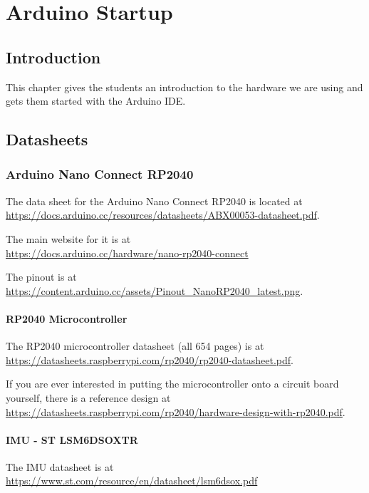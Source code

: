\chapter{Arduino Startup}

\section{Introduction}
This chapter gives the students an introduction to the hardware we are using and gets them started with 
the Arduino IDE.

\section{Datasheets}
\subsection{Arduino Nano Connect RP2040}
The data sheet for the Arduino Nano Connect RP2040 is located at\\ 
\href{https://docs.arduino.cc/resources/datasheets/ABX00053-datasheet.pdf}{https://docs.arduino.cc/resources/datasheets/ABX00053-datasheet.pdf}.

The main website for it is at \\
\href{https://docs.arduino.cc/hardware/nano-rp2040-connect}{https://docs.arduino.cc/hardware/nano-rp2040-connect}

The pinout is at \\
\href{https://content.arduino.cc/assets/Pinout\_NanoRP2040\_latest.png}{https://content.arduino.cc/assets/Pinout\_NanoRP2040\_latest.png}.

\subsubsection{RP2040 Microcontroller}
The RP2040 microcontroller datasheet (all 654 pages) is at \\
\href{https://datasheets.raspberrypi.com/rp2040/rp2040-datasheet.pdf}{https://datasheets.raspberrypi.com/rp2040/rp2040-datasheet.pdf}.

If you are ever interested in putting the microcontroller onto a circuit board yourself, there is a reference design at \\
\href{https://datasheets.raspberrypi.com/rp2040/hardware-design-with-rp2040.pdf}{https://datasheets.raspberrypi.com/rp2040/hardware-design-with-rp2040.pdf}.

\subsubsection{IMU - ST LSM6DSOXTR}
The IMU datasheet is at \\
\href{https://www.st.com/resource/en/datasheet/lsm6dsox.pdf}{https://www.st.com/resource/en/datasheet/lsm6dsox.pdf}


